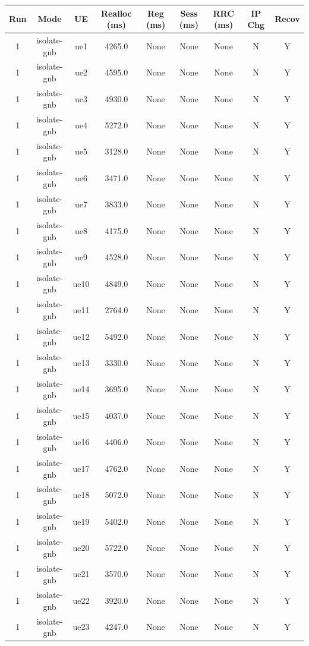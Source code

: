 \begin{table}[ht]
\centering
\begin{tabular}{|c|c|c|c|c|c|c|c|c|}
\hline
Run & Mode & UE & Realloc (ms) & Reg (ms) & Sess (ms) & RRC (ms) & IP Chg & Recov \\
\hline
1 & isolate-gnb & ue1 & 4265.0 & None & None & None & N & Y \\
1 & isolate-gnb & ue2 & 4595.0 & None & None & None & N & Y \\
1 & isolate-gnb & ue3 & 4930.0 & None & None & None & N & Y \\
1 & isolate-gnb & ue4 & 5272.0 & None & None & None & N & Y \\
1 & isolate-gnb & ue5 & 3128.0 & None & None & None & N & Y \\
1 & isolate-gnb & ue6 & 3471.0 & None & None & None & N & Y \\
1 & isolate-gnb & ue7 & 3833.0 & None & None & None & N & Y \\
1 & isolate-gnb & ue8 & 4175.0 & None & None & None & N & Y \\
1 & isolate-gnb & ue9 & 4528.0 & None & None & None & N & Y \\
1 & isolate-gnb & ue10 & 4849.0 & None & None & None & N & Y \\
1 & isolate-gnb & ue11 & 2764.0 & None & None & None & N & Y \\
1 & isolate-gnb & ue12 & 5492.0 & None & None & None & N & Y \\
1 & isolate-gnb & ue13 & 3330.0 & None & None & None & N & Y \\
1 & isolate-gnb & ue14 & 3695.0 & None & None & None & N & Y \\
1 & isolate-gnb & ue15 & 4037.0 & None & None & None & N & Y \\
1 & isolate-gnb & ue16 & 4406.0 & None & None & None & N & Y \\
1 & isolate-gnb & ue17 & 4762.0 & None & None & None & N & Y \\
1 & isolate-gnb & ue18 & 5072.0 & None & None & None & N & Y \\
1 & isolate-gnb & ue19 & 5402.0 & None & None & None & N & Y \\
1 & isolate-gnb & ue20 & 5722.0 & None & None & None & N & Y \\
1 & isolate-gnb & ue21 & 3570.0 & None & None & None & N & Y \\
1 & isolate-gnb & ue22 & 3920.0 & None & None & None & N & Y \\
1 & isolate-gnb & ue23 & 4247.0 & None & None & None & N & Y \\

\end{tabular}
\end{table}
